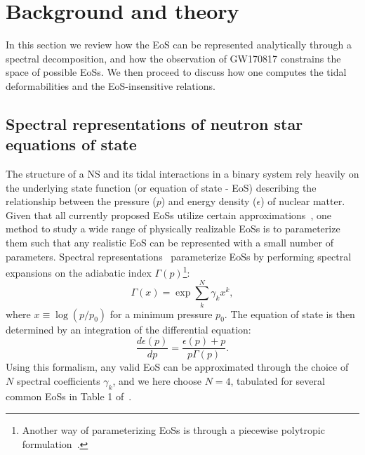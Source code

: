 \documentclass[prd,twocolumn,nofootinbib,superscriptaddress,amsmath,amssymb]{revtex4-1}
\begin{document}
\section{Background and theory}\label{sec:theory}

In this section we review how the EoS can be represented analytically
through a spectral decomposition, and how the observation of GW170817
constrains the space of possible EoSs. We then proceed to discuss 
how one computes the tidal deformabilities and the EoS-insensitive relations. 

\subsection{Spectral representations of neutron star equations of state}
\label{sec:eos}

The structure of a NS and its tidal interactions in a binary system rely heavily on the underlying state function (or equation of state - EoS) describing the relationship between the pressure ($p$) and energy density ($\epsilon$) of nuclear matter.
Given that all currently proposed EoSs utilize certain approximations~\cite{Oertel:Review,Baym:Review}, one method to study a wide range of physically realizable EoSs is to parameterize them such that any realistic EoS can be represented with a small number of parameters.
Spectral representations~\cite{Lindblom:2010bb,Lindblom:2012zi,Lindblom:2013kra,Lindblom:2018rfr,Abbott:2018exr} parameterize EoSs by performing spectral expansions on the adiabatic index $\Gamma(p)$\footnote{Another way of parameterizing EoSs is through a piecewise polytropic formulation~\cite{Read2009,Lackey:2014fwa,Carney:2018sdv}.}:
\begin{equation}
\Gamma(x) = \exp{\sum_k^{N}\gamma_k x^k},
\end{equation}
where $x \equiv \log{(p/p_0)}$ for a minimum pressure $p_0$.
The equation of state is then determined by an integration of the differential equation:
\begin{equation}
\frac{d \epsilon(p)}{dp}=\frac{\epsilon(p)+p}{p \Gamma(p)}.
\end{equation}
Using this formalism, any valid EoS can be approximated through the choice of $N$ spectral coefficients $\gamma_k$, and we here choose $N=4$, tabulated for several common EoSs in Table 1 of~\cite{Lindblom:2018rfr}.
\end{document}
